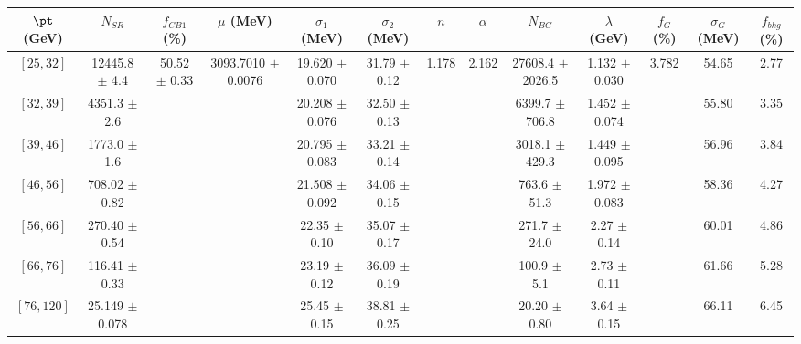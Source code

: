 \begin{tabular}{c||c|c|c|c|c|c|c|c|c|c|c||c}
$\pt$ (GeV) & $N_{SR}$ & $f_{CB1}$ (\%) & $\mu$ (MeV) & $\sigma_1$ (MeV) & $\sigma_2$ (MeV) & $n$ & $\alpha$ & $N_{BG}$ & $\lambda$ (GeV) & $f_G$ (\%) & $\sigma_G$ (MeV) & $f_{bkg}$ (\%) \\
\hline
$[25, 32]$ & 12445.8 $\pm$ 4.4 & \multirow{7}{*}{50.52 $\pm$ 0.33} & \multirow{7}{*}{3093.7010 $\pm$ 0.0076} & 19.620 $\pm$ 0.070 & 31.79 $\pm$ 0.12 & \multirow{7}{*}{1.178} & \multirow{7}{*}{2.162} & 27608.4 $\pm$ 2026.5 & 1.132 $\pm$ 0.030 & \multirow{7}{*}{3.782} & 54.65 & 2.77\\
$[32, 39]$ & 4351.3 $\pm$ 2.6 &  &  & 20.208 $\pm$ 0.076 & 32.50 $\pm$ 0.13 &  &  & 6399.7 $\pm$ 706.8 & 1.452 $\pm$ 0.074 &  & 55.80 & 3.35\\
$[39, 46]$ & 1773.0 $\pm$ 1.6 &  &  & 20.795 $\pm$ 0.083 & 33.21 $\pm$ 0.14 &  &  & 3018.1 $\pm$ 429.3 & 1.449 $\pm$ 0.095 &  & 56.96 & 3.84\\
$[46, 56]$ & 708.02 $\pm$ 0.82 &  &  & 21.508 $\pm$ 0.092 & 34.06 $\pm$ 0.15 &  &  & 763.6 $\pm$ 51.3 & 1.972 $\pm$ 0.083 &  & 58.36 & 4.27\\
$[56, 66]$ & 270.40 $\pm$ 0.54 &  &  & 22.35 $\pm$ 0.10 & 35.07 $\pm$ 0.17 &  &  & 271.7 $\pm$ 24.0 & 2.27 $\pm$ 0.14 &  & 60.01 & 4.86\\
$[66, 76]$ & 116.41 $\pm$ 0.33 &  &  & 23.19 $\pm$ 0.12 & 36.09 $\pm$ 0.19 &  &  & 100.9 $\pm$ 5.1 & 2.73 $\pm$ 0.11 &  & 61.66 & 5.28\\
$[76, 120]$ & 25.149 $\pm$ 0.078 &  &  & 25.45 $\pm$ 0.15 & 38.81 $\pm$ 0.25 &  &  & 20.20 $\pm$ 0.80 & 3.64 $\pm$ 0.15 &  & 66.11 & 6.45\\
\end{tabular}
